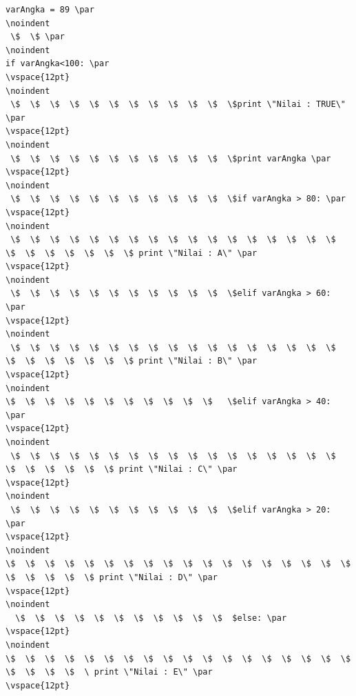 \begin{verbatim}
varAngka = 89 \par
\noindent 
 \$  \$ \par
\noindent 
if varAngka<100: \par
\vspace{12pt}
\noindent 
 \$  \$  \$  \$  \$  \$  \$  \$  \$  \$  \$  \$print \"Nilai : TRUE\" \par
\vspace{12pt}
\noindent 
 \$  \$  \$  \$  \$  \$  \$  \$  \$  \$  \$  \$print varAngka \par
\vspace{12pt}
\noindent 
 \$  \$  \$  \$  \$  \$  \$  \$  \$  \$  \$  \$if varAngka > 80: \par
\vspace{12pt}
\noindent 
 \$  \$  \$  \$  \$  \$  \$  \$  \$  \$  \$  \$  \$  \$  \$  \$  \$  \$  \$  \$  \$  \$  \$  \$ print \"Nilai : A\" \par
\vspace{12pt}
\noindent 
 \$  \$  \$  \$  \$  \$  \$  \$  \$  \$  \$  \$elif varAngka > 60: \par
\vspace{12pt}
\noindent 
 \$  \$  \$  \$  \$  \$  \$  \$  \$  \$  \$  \$  \$  \$  \$  \$  \$  \$  \$  \$  \$  \$  \$  \$ print \"Nilai : B\" \par
\vspace{12pt}
\noindent 
\$  \$  \$  \$  \$  \$  \$  \$  \$  \$  \$   \$elif varAngka > 40: \par
\vspace{12pt}
\noindent 
 \$  \$  \$  \$  \$  \$  \$  \$  \$  \$  \$  \$  \$  \$  \$  \$  \$  \$  \$  \$  \$  \$  \$ print \"Nilai : C\" \par
\vspace{12pt}
\noindent 
 \$  \$  \$  \$  \$  \$  \$  \$  \$  \$  \$  \$elif varAngka > 20: \par
\vspace{12pt}
\noindent 
\$  \$  \$  \$  \$  \$  \$  \$  \$  \$  \$  \$  \$  \$  \$  \$  \$  \$  \$  \$  \$  \$  \$ print \"Nilai : D\" \par
\vspace{12pt}
\noindent 
  \$  \$  \$  \$  \$  \$  \$  \$  \$  \$  \$  $else: \par
\vspace{12pt}
\noindent 
\$  \$  \$  \$  \$  \$  \$  \$  \$  \$  \$  \$  \$  \$  \$  \$  \$  \$  \$  \$  \$  \$  \ print \"Nilai : E\" \par
\vspace{12pt}

\end{verbatim}

